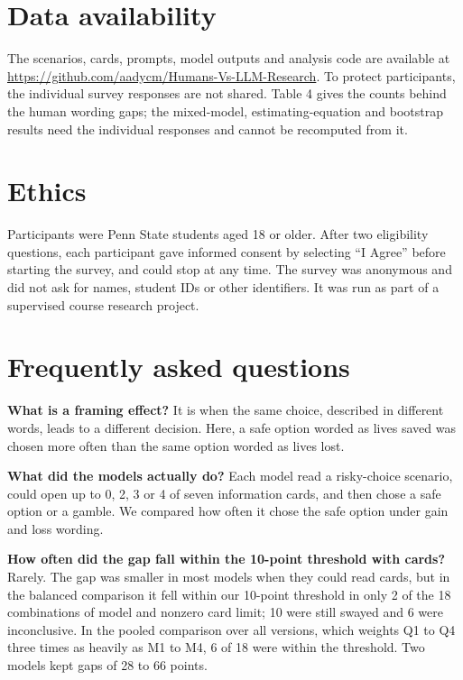 \documentclass[11pt]{article}
\begin{document}
\section*{Data availability}

The scenarios, cards, prompts, model outputs and analysis code are available at \url{https://github.com/aadycm/Humans-Vs-LLM-Research}. To protect participants, the individual survey responses are not shared. Table 4 gives the counts behind the human wording gaps; the mixed-model, estimating-equation and bootstrap results need the individual responses and cannot be recomputed from it.

\section*{Ethics}

Participants were Penn State students aged 18 or older. After two eligibility questions, each participant gave informed consent by selecting ``I Agree'' before starting the survey, and could stop at any time. The survey was anonymous and did not ask for names, student IDs or other identifiers. It was run as part of a supervised course research project.

\section*{Frequently asked questions}

\textbf{What is a framing effect?} It is when the same choice, described in different words, leads to a different decision. Here, a safe option worded as lives saved was chosen more often than the same option worded as lives lost.

\textbf{What did the models actually do?} Each model read a risky-choice scenario, could open up to 0, 2, 3 or 4 of seven information cards, and then chose a safe option or a gamble. We compared how often it chose the safe option under gain and loss wording.

\textbf{How often did the gap fall within the 10-point threshold with cards?} Rarely. The gap was smaller in most models when they could read cards, but in the balanced comparison it fell within our 10-point threshold in only 2 of the 18 combinations of model and nonzero card limit; 10 were still swayed and 6 were inconclusive. In the pooled comparison over all versions, which weights Q1 to Q4 three times as heavily as M1 to M4, 6 of 18 were within the threshold. Two models kept gaps of 28 to 66 points.
\end{document}
